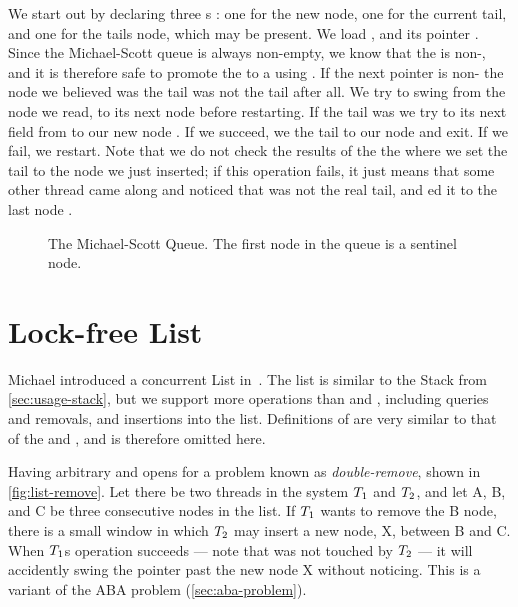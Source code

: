 We start out by declaring three s : one for the new node, one for the
current tail, and one for the tails  node, which may be present.  We load 
, and its  pointer .  Since the Michael-Scott queue is always
non-empty, we know that the  is non-, and it is therefore safe to promote the
 to a  using .  If the next pointer is non-
the node we believed was the tail was not the tail after all. We try to swing  from the
node we read, to its next node  before restarting.  If the tail was  we try
to  its next field from  to our new node . If we succeed, we
 the tail to our node and exit. If we fail, we restart.  Note that we do not check the
results of the the  where we set the tail to the node we just inserted; if this operation
fails, it just means that some other thread came along and noticed that  was not the
real tail, and ed it to the last node .

\begin{figure}[ht]
\centering

\caption{The Michael-Scott Queue. The first node in the queue is a sentinel node.}
\end{figure}



\section{Lock-free List}

Michael introduced a concurrent List in~\cite{harris2001pragmatic}. The list is similar to the
Stack from \cref{sec:usage-stack}, but we support more operations than  and ,
including queries and removals, and insertions into the list. Definitions of  are very
similar to that of the  and , and is therefore omitted here.

Having arbitrary  and  opens for a problem known as \emph{double-remove},
shown in \cref{fig:list-remove}. Let there be two threads in the system $T\sb{1}$ and $T\sb{2}$,
and let A, B, and C be three consecutive nodes in the list. If $T\sb{1}$ wants to remove the B
node, there is a small window in which $T\sb{2}$ may insert a new node, X, between B and C. When
$T\sb{1}$s  operation succeeds --- note that  was not touched by $T\sb{2}$
--- it will accidently swing the pointer past the new node X without noticing. This is a variant of
the ABA problem (\cref{sec:aba-problem}).

